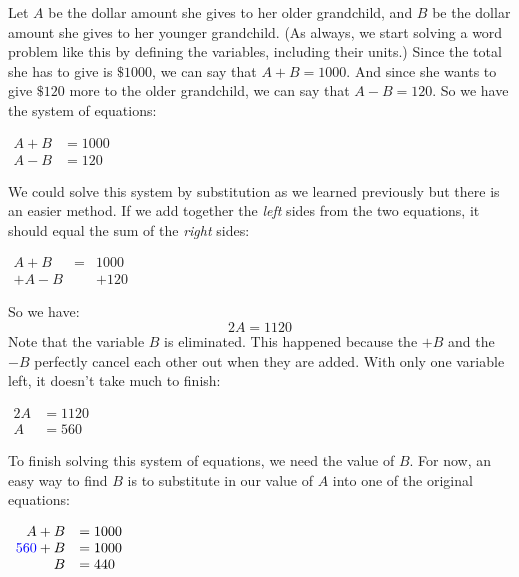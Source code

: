 \documentclass[nooutcomes]{ximera}
\begin{document}
\begin{example}
\begin{explanation}
 Let $A$ be the dollar amount she gives to her older grandchild,
        and $B$ be the dollar amount she gives to her younger grandchild.
        (As always, we start solving a word problem like this by defining the variables,
        including their units.)
        Since the total she has to give is $\$1000$,
        we can say that $A+B=1000$.
        And since she wants to give $\$120$ more to the older grandchild,
        we can say that $A-B=120$.
        So we have the system of equations:
    \begin{center}
$
          \begin{aligned}
          A+B & = 1000 \\
          A-B & = 120
          \end{aligned}
$
\end{center}
 We could solve this system by substitution as we learned previously
        but there is an easier method.
        If we add together the \textit{left}
        sides from the two equations,
        it should equal the sum of the \textit{right} sides:
\begin{center}
$
           \begin{array}{rcl}
A+B &=&1000\\
+A-B & & +120
\end{array}
          $
\end{center}
So we have:
$$
          2A=1120
$$
Note that the variable $B$ is eliminated.
        This happened because the $+B$
        and the $-B$
        perfectly cancel each other out when they are added.
        With only one variable left, it doesn't take much to finish:
\begin{center}
$    
    \begin{array}{rl}
          2A&=1120\\
 A&=560
\end{array}
$
\end{center}
To finish solving this system of equations,
        we need the value of $B$.
        For now, an easy way to find $B$ is to substitute in our value of $A$ into one of the original equations:
\begin{center}
$   
\begin{array}{rl}
          A+B&=1000\\
          {\color{blue}{{560}}}+B&=1000\\
B&=440
\end{array}
$
\end{center}  


\end{explanation}
\end{example}
\end{document}
